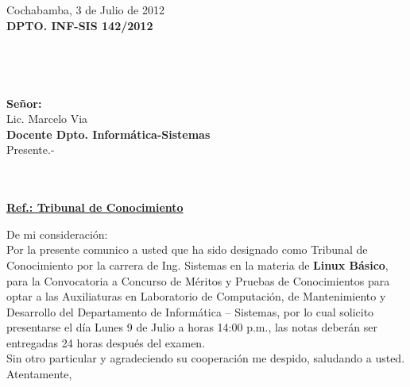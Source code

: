 \documentclass[letterpaper,11pt]{letter}
\begin{document}
Cochabamba, 3 de Julio de 2012~\\
 \textbf{DPTO. INF-SIS 142/2012}\\
~\\
~\\
~\\
~\\
 \textbf{Señor:}~\\
Lic. Marcelo Via~\\
 \textbf{Docente Dpto. Informática-Sistemas}~\\
Presente.-\\
~\\
~\\
\begin{center}
\underline{ \textbf{Ref.: Tribunal de Conocimiento}}
\end{center}
De mi consideración:\\
Por la presente comunico a usted que ha sido designado como Tribunal de Conocimiento por la carrera de Ing. Sistemas en la materia de \textbf{Linux Básico}, para la Convocatoria a Concurso de Méritos y Pruebas de Conocimientos para optar a las Auxiliaturas en Laboratorio de Computación, de Mantenimiento y Desarrollo del Departamento de Informática – Sistemas, por lo cual solicito presentarse el día Lunes 9 de Julio a horas 14:00 p.m., las notas deberán ser entregadas 24 horas después del examen.\\
Sin otro particular y agradeciendo su cooperación me despido, saludando a usted.\\
Atentamente,\\
\end{document}
